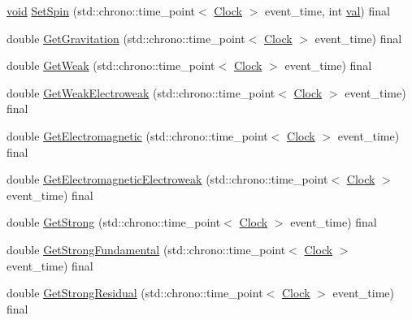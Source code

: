 \begin{DoxyCompactItemize}
\item 
\mbox{\hyperlink{glad_8h_a950fc91edb4504f62f1c577bf4727c29}{void}} \mbox{\hyperlink{class_dimension_a8d73c050c67b0226572b4a1b08ae6594}{Set\+Spin}} (std\+::chrono\+::time\+\_\+point$<$ \mbox{\hyperlink{universe_8h_a0ef8d951d1ca5ab3cfaf7ab4c7a6fd80}{Clock}} $>$ event\+\_\+time, int \mbox{\hyperlink{glad_8h_a26942fd2ed566ef553eae82d2c109c8f}{val}}) final
\item 
double \mbox{\hyperlink{class_dimension_a652220a2eb1b26c749ad032865d81788}{Get\+Gravitation}} (std\+::chrono\+::time\+\_\+point$<$ \mbox{\hyperlink{universe_8h_a0ef8d951d1ca5ab3cfaf7ab4c7a6fd80}{Clock}} $>$ event\+\_\+time) final
\item 
double \mbox{\hyperlink{class_dimension_a656ce92d07ea600cc0ec53865ad515e2}{Get\+Weak}} (std\+::chrono\+::time\+\_\+point$<$ \mbox{\hyperlink{universe_8h_a0ef8d951d1ca5ab3cfaf7ab4c7a6fd80}{Clock}} $>$ event\+\_\+time) final
\item 
double \mbox{\hyperlink{class_dimension_a5bb5a164564013a60728854cc2e5ddb3}{Get\+Weak\+Electroweak}} (std\+::chrono\+::time\+\_\+point$<$ \mbox{\hyperlink{universe_8h_a0ef8d951d1ca5ab3cfaf7ab4c7a6fd80}{Clock}} $>$ event\+\_\+time) final
\item 
double \mbox{\hyperlink{class_dimension_a21783c29a576518b722512f1245fa598}{Get\+Electromagnetic}} (std\+::chrono\+::time\+\_\+point$<$ \mbox{\hyperlink{universe_8h_a0ef8d951d1ca5ab3cfaf7ab4c7a6fd80}{Clock}} $>$ event\+\_\+time) final
\item 
double \mbox{\hyperlink{class_dimension_ae1babb1fa280c35966d7ee3de6655e4d}{Get\+Electromagnetic\+Electroweak}} (std\+::chrono\+::time\+\_\+point$<$ \mbox{\hyperlink{universe_8h_a0ef8d951d1ca5ab3cfaf7ab4c7a6fd80}{Clock}} $>$ event\+\_\+time) final
\item 
double \mbox{\hyperlink{class_dimension_ae36aadad4ae84735a5ff73bff4eb97b1}{Get\+Strong}} (std\+::chrono\+::time\+\_\+point$<$ \mbox{\hyperlink{universe_8h_a0ef8d951d1ca5ab3cfaf7ab4c7a6fd80}{Clock}} $>$ event\+\_\+time) final
\item 
double \mbox{\hyperlink{class_dimension_ad0d067d7f9dc4841b0ad280979ebe7af}{Get\+Strong\+Fundamental}} (std\+::chrono\+::time\+\_\+point$<$ \mbox{\hyperlink{universe_8h_a0ef8d951d1ca5ab3cfaf7ab4c7a6fd80}{Clock}} $>$ event\+\_\+time) final
\item 
double \mbox{\hyperlink{class_dimension_aeee6025f17d9cd1bf7f324d715a30691}{Get\+Strong\+Residual}} (std\+::chrono\+::time\+\_\+point$<$ \mbox{\hyperlink{universe_8h_a0ef8d951d1ca5ab3cfaf7ab4c7a6fd80}{Clock}} $>$ event\+\_\+time) final

\end{DoxyCompactItemize}
